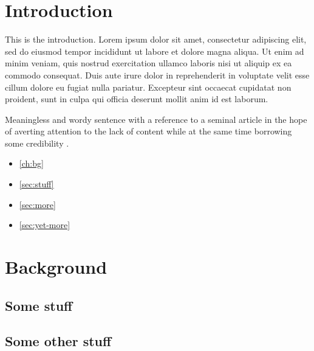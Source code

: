 \documentclass[english]{ufsc-thesis-rn46-2019}
\begin{document}
\pretextual%
\imprimircapa%
\imprimirfolhaderosto*%
\clearpage
\tableofcontents%
\textual%
\cleardoublepage

\chapter{Introduction}

This is the introduction. Lorem ipsum dolor sit amet, consectetur adipiscing elit, sed do eiusmod tempor incididunt ut labore et dolore magna aliqua. Ut enim ad minim veniam, quis nostrud exercitation ullamco laboris nisi ut aliquip ex ea commodo consequat. Duis aute irure dolor in reprehenderit in voluptate velit esse cillum dolore eu fugiat nulla pariatur. Excepteur sint occaecat cupidatat non proident, sunt in culpa qui officia deserunt mollit anim id est laborum.

Meaningless and wordy sentence with a reference to a seminal article in the hope of averting attention to the lack of content while at the same time borrowing some credibility \cite{turing1937computable}.

\begin{itemize}
\item \autoref{ch:bg}
\item \autoref{sec:stuff}
\item \autoref{sec:more}
\item \autoref{sec:yet-more}
\end{itemize}

\lipsum[1]

\chapter{Background}
\label{ch:bg}

\lipsum[1]

\section{Some stuff}
\label{sec:stuff}

\lipsum[1]

\section{Some other stuff}
\end{document}
